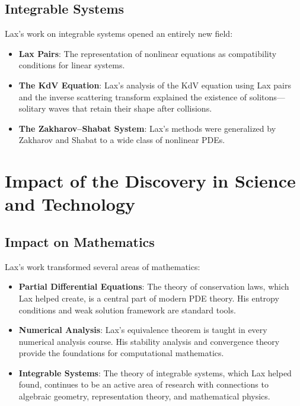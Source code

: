 \subsection{Integrable Systems}

Lax's work on integrable systems opened an entirely new field:

\begin{itemize}
\item \textbf{Lax Pairs}: The representation of nonlinear equations as compatibility conditions for linear systems.

\item \textbf{The KdV Equation}: Lax's analysis of the KdV equation using Lax pairs and the inverse scattering transform explained the existence of solitons---solitary waves that retain their shape after collisions.

\item \textbf{The Zakharov--Shabat System}: Lax's methods were generalized by Zakharov and Shabat to a wide class of nonlinear PDEs.
\end{itemize}

\section{Impact of the Discovery in Science and Technology}

\subsection{Impact on Mathematics}

Lax's work transformed several areas of mathematics:

\begin{itemize}
\item \textbf{Partial Differential Equations}: The theory of conservation laws, which Lax helped create, is a central part of modern PDE theory. His entropy conditions and weak solution framework are standard tools.

\item \textbf{Numerical Analysis}: Lax's equivalence theorem is taught in every numerical analysis course. His stability analysis and convergence theory provide the foundations for computational mathematics.

\item \textbf{Integrable Systems}: The theory of integrable systems, which Lax helped found, continues to be an active area of research with connections to algebraic geometry, representation theory, and mathematical physics.
\end{itemize}

